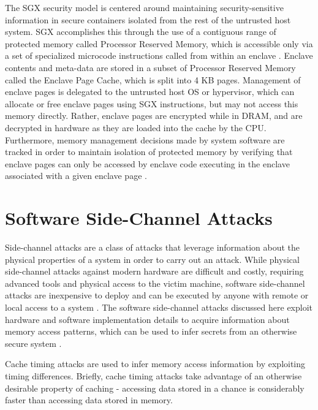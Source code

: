 The SGX security model is centered around maintaining security-sensitive information in secure containers isolated from the rest of the untrusted host system. SGX accomplishes this through the use of a contiguous range of protected memory called Processor Reserved Memory, which is accessible only via a set of specialized microcode instructions called from within an enclave \cite{costan_intel_2016}. Enclave contents and meta-data are stored in a subset of Processor Reserved Memory called the Enclave Page Cache, which is split into 4 KB pages. Management of enclave pages is delegated to the untrusted host OS or hypervisor, which can allocate or free enclave pages using SGX instructions, but may not access this memory directly. Rather, enclave pages are encrypted while in DRAM, and are decrypted in hardware as they are loaded into the cache by the CPU. Furthermore, memory management decisions made by system software are tracked in order to maintain isolation of protected memory by verifying that enclave pages can only be accessed by enclave code executing in the enclave associated with a given enclave page \cite{intel_corporation_intel_2016, costan_intel_2016, moghimi_cachezoom:_2017}. 

\section{Software Side-Channel Attacks}

Side-channel attacks are a class of attacks that leverage information about the physical properties of a system in order to carry out an attack. While physical side-channel attacks against modern hardware are difficult and costly, requiring advanced tools and physical access to the victim machine, software side-channel attacks are inexpensive to deploy and can be executed by anyone with remote or local access to a system \cite{costan_intel_2016}. The software side-channel attacks discussed here exploit hardware and software implementation details to acquire information about memory access patterns, which can be used to infer secrets from an otherwise secure system \cite{gotzfried_cache_2017, schwarz_malware_2017, xu_controlled-channel_2015, shinde_preventing_2015}. 

Cache timing attacks are used to infer memory access information by exploiting timing differences. Briefly, cache timing attacks take advantage of an otherwise desirable property of caching - accessing data stored in a chance is considerably faster than accessing data stored in memory. 

